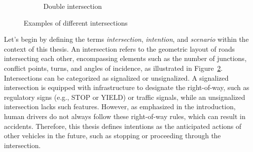 \begin{figure}[h]
\begin{subfigure}[t]{0.48\columnwidth}
		\label{fig:double_intersection}

		\caption{Double intersection}
	\end{subfigure}

	\caption{Examples of different intersections}
	\label{fig:example_intersections}
\end{figure}
Let's begin by defining the terms \textit{intersection}, \textit{intention}, and \textit{scenario} within the context of this thesis.
An intersection refers to the geometric layout of roads intersecting each other, encompassing elements such as the number of junctions, conflict points, turns, and angles of incidence, as illustrated in Figure~\ref{fig:example_intersections}. 
Intersections can be categorized as signalized or unsignalized. A signalized intersection is equipped with infrastructure to designate the right-of-way, such as regulatory signs (e.g., STOP or YIELD) or traffic signals, while an unsignalized intersection lacks such features. However, as emphasized in the introduction, human drivers do not always follow these right-of-way rules, which can result in accidents. Therefore, this thesis defines intentions as the anticipated actions of other vehicles in the future, such as stopping or proceeding through the intersection.

